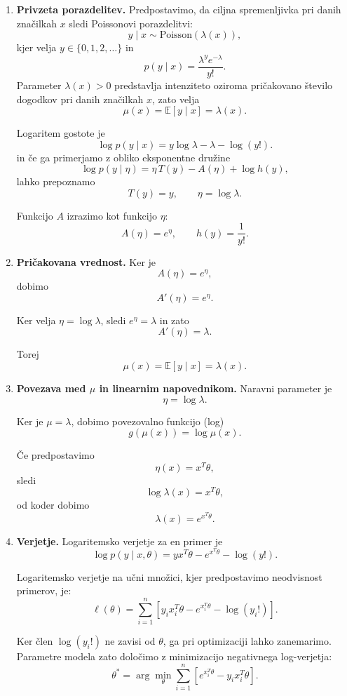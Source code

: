 \begin{enumerate}

\item \textbf{Privzeta porazdelitev.}
Predpostavimo, da ciljna spremenljivka pri danih značilkah $x$ sledi
Poissonovi porazdelitvi:
\[
y \mid x \sim \mathrm{Poisson}(\lambda(x)),
\]
kjer velja $y \in \{0,1,2,\dots\}$ in
\[
p(y \mid x) = \frac{\lambda^y e^{-\lambda}}{y!}.
\]
Parameter $\lambda(x) > 0$ predstavlja intenziteto oziroma pričakovano število dogodkov pri danih značilkah $x$, zato velja
\[
\mu(x) = \mathbb{E}[y \mid x] = \lambda(x).
\]

Logaritem gostote je
\[
\log p(y \mid x)
= y \log \lambda - \lambda - \log(y!).
\]
in če ga primerjamo z obliko eksponentne družine
\[
\log p(y \mid \eta)
= \eta\,T(y) - A(\eta) + \log h(y),
\]
lahko prepoznamo
\[
T(y)=y, \qquad
\eta = \log \lambda.
\]

Funkcijo $A$ izrazimo kot funkcijo $\eta$:
\[
A(\eta) = e^\eta, \qquad
h(y) = \frac{1}{y!}.
\]

\item \textbf{Pričakovana vrednost.} Ker je
\[
A(\eta) = e^\eta,
\]
dobimo
\[
A'(\eta) = e^\eta.
\]

Ker velja $\eta = \log \lambda$, sledi $e^\eta = \lambda$ in zato
\[
A'(\eta) = \lambda.
\]

Torej
\[
\mu(x) = \mathbb{E}[y \mid x] = \lambda(x).
\]

\item \textbf{Povezava med $\mu$ in linearnim napovednikom.}
Naravni parameter je
\[
\eta = \log \lambda.
\]

Ker je $\mu = \lambda$, dobimo povezovalno funkcijo (log)
\[
g(\mu(x)) = \log \mu(x).
\]

Če predpostavimo
\[
\eta(x) = x^T\theta,
\]
sledi
\[
\log \lambda(x) = x^T\theta,
\]
od koder dobimo
\[
\lambda(x) = e^{x^T\theta}.
\]

\item \textbf{Verjetje.}
Logaritemsko verjetje za en primer je
\[
\log p(y \mid x, \theta)
= y x^T\theta - e^{x^T\theta} - \log(y!).
\]

Logaritemsko verjetje na učni množici, kjer predpostavimo neodvisnost primerov, je:
\[
\ell(\theta)
= \sum_{i=1}^n \left[
y_i x_i^T\theta - e^{x_i^T\theta} - \log(y_i!)
\right].
\]

Ker člen $\log(y_i!)$ ne zavisi od $\theta$, ga pri optimizaciji
lahko zanemarimo. Parametre modela zato določimo z minimizacijo
negativnega log-verjetja:
\[
\theta^*
=
\arg\min_\theta
\sum_{i=1}^n \left[
e^{x_i^T\theta} - y_i x_i^T\theta
\right].
\]

\end{enumerate}


